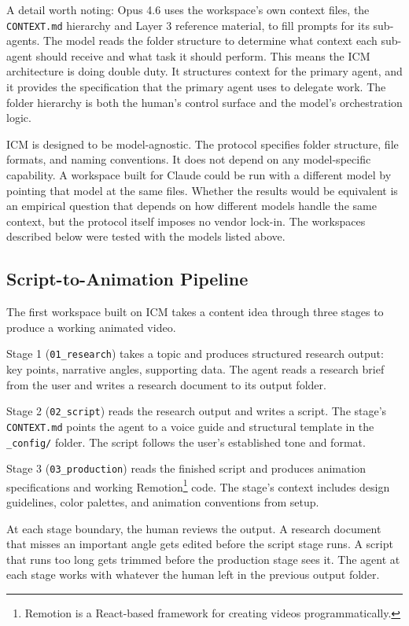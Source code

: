 \documentclass[acmlarge,nonacm,screen]{acmart}
\begin{document}
A detail worth noting: Opus 4.6 uses the workspace's own context files, the \texttt{CONTEXT.md} hierarchy and Layer 3 reference material, to fill prompts for its sub-agents. The model reads the folder structure to determine what context each sub-agent should receive and what task it should perform. This means the ICM architecture is doing double duty. It structures context for the primary agent, and it provides the specification that the primary agent uses to delegate work. The folder hierarchy is both the human's control surface and the model's orchestration logic.

ICM is designed to be model-agnostic. The protocol specifies folder structure, file formats, and naming conventions. It does not depend on any model-specific capability. A workspace built for Claude could be run with a different model by pointing that model at the same files. Whether the results would be equivalent is an empirical question that depends on how different models handle the same context, but the protocol itself imposes no vendor lock-in. The workspaces described below were tested with the models listed above.

\subsection{Script-to-Animation Pipeline}

The first workspace built on ICM takes a content idea through three stages to produce a working animated video.

Stage 1 (\texttt{01\_research}) takes a topic and produces structured research output: key points, narrative angles, supporting data. The agent reads a research brief from the user and writes a research document to its output folder.

Stage 2 (\texttt{02\_script}) reads the research output and writes a script. The stage's \texttt{CONTEXT.md} points the agent to a voice guide and structural template in the \texttt{\_config/} folder. The script follows the user's established tone and format.

Stage 3 (\texttt{03\_production}) reads the finished script and produces animation specifications and working Remotion\footnote{Remotion is a React-based framework for creating videos programmatically.} code. The stage's context includes design guidelines, color palettes, and animation conventions from setup.

At each stage boundary, the human reviews the output. A research document that misses an important angle gets edited before the script stage runs. A script that runs too long gets trimmed before the production stage sees it. The agent at each stage works with whatever the human left in the previous output folder.
\end{document}
